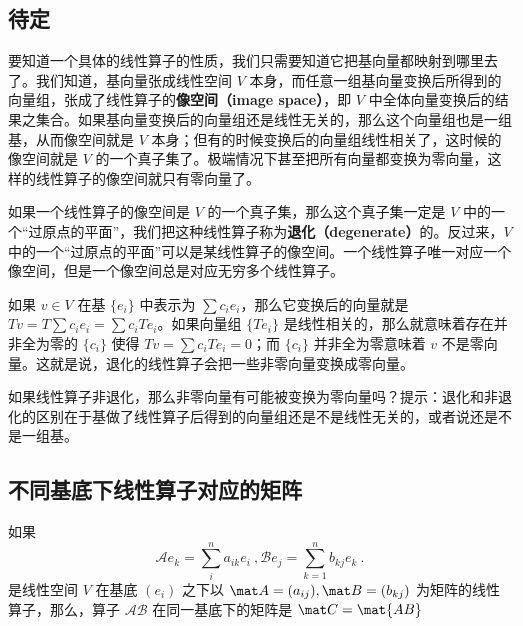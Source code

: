 \subsection{待定}



要知道一个具体的线性算子的性质，我们只需要知道它把基向量都映射到哪里去了。我们知道，基向量张成线性空间 $V$ 本身，而任意一组基向量变换后所得到的向量组，张成了线性算子的\textbf{像空间（image space）}，即 $V$ 中全体向量变换后的结果之集合。如果基向量变换后的向量组还是线性无关的，那么这个向量组也是一组基，从而像空间就是 $V$ 本身；但有的时候变换后的向量组线性相关了，这时候的像空间就是 $V$ 的一个真子集了。极端情况下甚至把所有向量都变换为零向量，这样的线性算子的像空间就只有零向量了。

如果一个线性算子的像空间是 $V$ 的一个真子集，那么这个真子集一定是 $V$ 中的一个“过原点的平面”，我们把这种线性算子称为\textbf{退化（degenerate）}的。反过来，$V$ 中的一个“过原点的平面”可以是某线性算子的像空间。一个线性算子唯一对应一个像空间，但是一个像空间总是对应无穷多个线性算子。

如果 $v\in V$ 在基 $\{{e}_i\}$ 中表示为 $\sum c_i {e}_i$，那么它变换后的向量就是 $T v=T\sum c_i {e}_i=\sum c_iT {e}_i$。如果向量组 $\{T {e}_i\}$ 是线性相关的，那么就意味着存在并非全为零的 $\{c_i\}$ 使得 $T v=\sum c_iT {e}_i=0$；而 $\{c_i\}$ 并非全为零意味着 $v$ 不是零向量。这就是说，退化的线性算子会把一些非零向量变换成零向量。

\begin{exercise}{}
如果线性算子非退化，那么非零向量有可能被变换为零向量吗？提示：退化和非退化的区别在于基做了线性算子后得到的向量组还是不是线性无关的，或者说还是不是一组基。
\end{exercise}

\subsection{不同基底下线性算子对应的矩阵}\label{sub_LiOper_1}


\begin{theorem}{}\label{the_LiOper_1}
如果
\begin{equation}
\mathcal{A} e_k = \sum_i^{n}a_{ik} e_i~, \mathcal{B} e_j = \sum_{k=1}^n b_{kj} e_k~.
\end{equation}
是线性空间 $V$ 在基底 $( e_i)$ 之下以 $\mat A=(a_{ij}), \mat B=(b_{kj})$ 为矩阵的线性算子，那么，算子 $\mathcal{AB}$ 在同一基底下的矩阵是 $\mat C=\mat{AB}$
\end{theorem}

